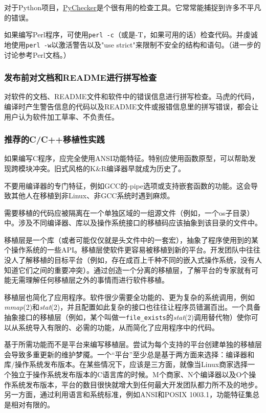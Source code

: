 \documentclass[12pt,oneside]{ctexbook}
\begin{document}
\begin{common-format}
对于Python项目，\href{http://sourceforge.net/projects/pychecker}{PyChecker}是个很有用的检查工具。它常常能捕捉到许多不平凡的错误。

如果编写Perl程序，可使用\verb+perl -c+（或是-T，如果可用的话）检查代码。并虔诚地使用\verb+perl -w+以激活警告以及"use strict"来限制不安全的结构和语句。（进一步的讨论参考Perl文档。）

\subsubsection{发布前对文档和README进行拼写检查}
对软件的文档、README文件和软件中的错误信息进行拼写检查。马虎的代码，编译时产生警告信息的代码以及README文件或报错信息里的拼写错误，都会让用户认为软件加工草率、不负责任。

\subsubsection{推荐的C/C++移植性实践}
如果编写C程序，应完全使用ANSI功能特征。特别应使用函数原型，可以帮助发现跨模块冲突。旧式风格的K\&{}R编译器早就成为历史了。

不要用编译器的专门特征，例如GCC的-pipe选项或支持嵌套函数的功能。这会导致其他人在移植到非Linux、非GCC系统时遇到麻烦。

需要移植的代码应被隔离在一个单独区域的一组源文件（例如，一个os子目录）中。涉及不同编译器、库以及操作系统接口的移植码应该抽象到该目录的文件中。

移植层是一个库（或者可能仅仅就是头文件中的一套宏），抽象了程序使用到的某个操作系统的一些API。移植层使软件更容易被移植到新的平台。开发团队中往往没人了解移植的目标平台（例如，存在成百上千种不同的嵌入式操作系统，没有人知道它们之间的重要冲突）。通过创造一个分离的移植层，了解平台的专家就有可能无需理解任何移植层之外的事情而进行软件移植。

移植层也简化了应用程序。软件很少需要全功能的、更为复杂的系统调用，例如\textit{mmap}(2)和\textit{stat}(2)，并且配置如此复杂的接口也往往让程序员错漏百出。一个具备抽象接口的移植层（例如，某个叫做一\verb+file_exists+的\textit{stat}(2)调用替代物）使你可以从系统导入有限的、必需的功能，从而简化了应用程序中的代码。

基于所需功能而不是平台来编写移植层。尝试为每个支持的平台创建单独的移植层会导致多重更新的维护梦魇。一个“平台”至少总是基于两方面来选择：编译器和库/操作系统发布版本。在某些情况下，应该是三方面，就像当Linux商家选择一个独立于操作系统发布版本的C语言库的时候。M个商家、N个编译器以及O个操作系统发布版本，平台的数目很快就增大到任何最大开发团队都力所不及的地步。另一方面，通过利用语言和系统标准，例如ANSI和POSIX 1003.1，功能特征集总是相对有限的。


\end{common-format}
\end{document}
